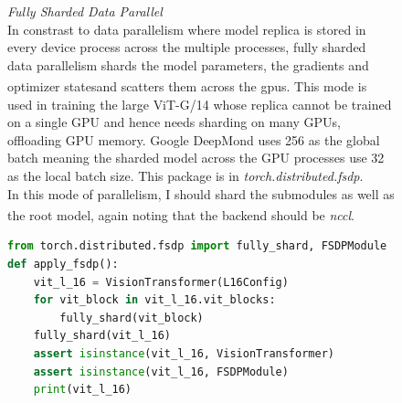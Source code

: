 \documentclass[12pt]{article}
\newcommand{\customtext}[3]{%
    \vspace{#2} %
    \fontsize{13}{8}\textcolor{#1}{\textit{#3}}%
}
\newcommand{\sidecite}[1]{\textsuperscript{\textcolor{blue}{\textbf{\scriptsize#1}}}}
\newcommand{\maincitecount}{\sidecite{\stepcounter{maincite}\themaincite}}
\begin{document}
\begin{figure}[!htb]
    \begin{minipage}[t]{0.65\textwidth}
    \customtext{xtitle}{0em}{Fully Sharded Data Parallel}\\
    In constrast to data parallelism where model replica is stored in every device process 
    across the multiple processes, fully sharded data parallelism shards the model parameters,
    the gradients and optimizer states\maincitecount and scatters them across the gpus. 
    This mode is used in training the large {ViT-G/14} whose replica cannot be trained on a single
     GPU and hence needs sharding on many GPUs, offloading GPU memory. Google DeepMond 
     uses 256 as the global batch meaning the sharded model across the GPU processes use 
     32 as the local batch size. This package is in {\it\color{xlink}torch.distributed.fsdp}.\\
    In this mode of parallelism, I should shard the submodules as well as the root model\maincitecount,
    again noting that the backend should be {\it nccl}. 
\begin{lstlisting}[language=python,style=python,basicstyle=\ttfamily\footnotesize]
from torch.distributed.fsdp import fully_shard, FSDPModule
def apply_fsdp():
    vit_l_16 = VisionTransformer(L16Config)
    for vit_block in vit_l_16.vit_blocks:
        fully_shard(vit_block)
    fully_shard(vit_l_16)
    assert isinstance(vit_l_16, VisionTransformer)
    assert isinstance(vit_l_16, FSDPModule)
    print(vit_l_16)


\end{lstlisting}
\end{minipage}
\end{figure}
\end{document}
